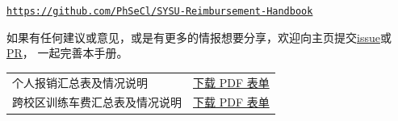 \setlength{\parindent}{2\ccwd}

\noindent\href{https://github.com/PhSeCl/SYSU-Reimbursement-Handbook}{\textcolor{BookBlue}{\nolinkurl{https://github.com/PhSeCl/SYSU-Reimbursement-Handbook}}}

\noindent 如果有任何建议或意见，或是有更多的情报想要分享，欢迎向主页提交\href{https://github.com/PhSeCl/SYSU-Reimbursement-Handbook/issues}{\textcolor{BookBlue}{issue}}或\href{https://github.com/PhSeCl/SYSU-Reimbursement-Handbook/pulls}{\textcolor{BookBlue}{PR}}，
一起完善本手册。

\vspace{10mm}
\begingroup
\sffamily\fontsize{10.5}{18}\selectfont
\setlength{\tabcolsep}{10pt}
\renewcommand{\arraystretch}{1.4}
\begin{tabularx}{\linewidth}{@{}Y p{45mm}@{}}
\toprule
{} &  \\[3pt]\midrule
个人报销汇总表及情况说明 & \href{https://github.com/PhSeCl/SYSU-Reimbursement-Handbook/releases/download/v2026.11.05/reimbursement-summary-form.pdf}{\textcolor{BookBlue}{下载 PDF 表单}} \\[8pt]\midrule
跨校区训练车费汇总表及情况说明 & \href{https://github.com/PhSeCl/SYSU-Reimbursement-Handbook/releases/download/v2026.11.05/cross-campus-summary-form.pdf}{\textcolor{BookBlue}{下载 PDF 表单}} \\[8pt]\bottomrule
\end{tabularx}\par
\endgroup
